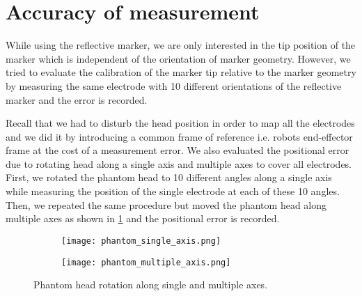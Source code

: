 \section{Accuracy of measurement}

While using the reflective marker, we are only interested in the tip position of the marker which is independent of the orientation of marker geometry. However, we tried to evaluate the calibration of the marker tip relative to the marker geometry by measuring the same electrode with 10 different orientations of the reflective marker and the error is recorded. 
 
Recall that we had to disturb the head position in order to map all the electrodes and we did it by introducing a common frame of reference i.e. robots end-effector frame at the cost of a measurement error. We also evaluated the positional error due to rotating head along a single axis and multiple axes to cover all electrodes. First, we rotated the phantom head to 10 different angles along a single axis while measuring the position of the single electrode at each of these 10 angles. Then, we repeated the same procedure but moved the phantom head along multiple axes as shown in \cref{fig:phantom_multiple_axis} and the positional error is recorded. 

\begin{figure}[hbt!]
	\centering
	\begin{subfigure}{0.49\textwidth}
		\texttt{[image: phantom\_single\_axis.png]}	
	\end{subfigure}
	\hfill
	\begin{subfigure}{0.49\textwidth}
		\texttt{[image: phantom\_multiple\_axis.png]}	
	\end{subfigure}
	\caption{Phantom head rotation along single and multiple axes.} 
	\label{fig:phantom_multiple_axis}
\end{figure} 

